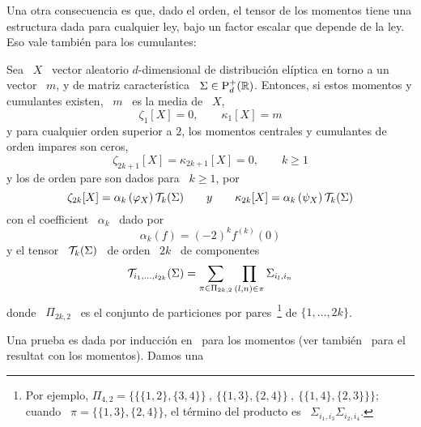 Una otra consecuencia es que, dado el orden, el tensor de los momentos tiene una
estructura dada  para cualquier ley,  bajo un factor  escalar que depende  de la
ley.  Eso vale tambi\'en para los cumulantes:
%
\begin{teorema}\label{Teo:MP:MomentosCumulantesEliptica}
%
  Sea \  $X$ \  vector aleatorio $d$-dimensional  de distribuci\'on  el\'iptica en
  torno a  un  vector \  $m$,  y  de  matriz  caracter\'istica \  $\Sigma  \in
  \mathrm{P}_d^+(\mathbb{R})$.  Entonces, si  estos momentos y cumulantes existen,  \ $m$ \ es
  la media de \ $X$, \ie
  \[
  \zeta_1[X] = 0, \qquad \kappa_1[X] = m
  \]
  y para cualquier orden superior a  $2$, los momentos centrales y cumulantes de
  orden impares son ceros,
  \[
  \zeta_{2 k + 1}[X] = \kappa_{2 k + 1}[X] = 0, \qquad k \ge 1
  \]
  y los de orden pare son dados para \ $k \ge 1$, por
  \[
  \zeta_{2 k}[X] = \alpha_k\left(  \varphi_X   \right) \mathcal{T}_k(\Sigma)
 \qquad  y \qquad \kappa_{2 k}[X] = \alpha_k\left(  \psi_X   \right) \mathcal{T}_k(\Sigma)
  \]
  con el coefficient \ $\alpha_k$ \ dado por
  \[
  \alpha_k(f) = (-2)^k f^{(k)}(0)
  \]
  y el tensor \ $\mathcal{T}_k(\Sigma)$ \ de orden \ $2 k$ \ de componentes
  \[
  \mathcal{T}_{i_1,\ldots,i_{2k}}(\Sigma) = \sum_{\pi \in \Pi_{2 k , 2}} \prod_{(l,n) \in
    \pi} \Sigma_{i_l,i_n}
  \]
  donde   \  $\Pi_{2   k  ,   2}$   \  es   el  conjunto   de  particiones   por
  pares~\footnote{Por  ejemplo, $\Pi_{4,2}  =  \Big\{ \big\{  \{1,2\} ,  \{3,4\}
    \big\} \:  , \: \big\{  \{1,3\} ,  \{2,4\} \big\} \:  , \: \big\{  \{1,4\} ,
    \{2,3\} \big\} \big\}$; cuando \ $\pi = \big\{ \{1,3\} , \{2,4\} \Big\}$, el
    t\'ermino del producto es \ $\Sigma_{i_1,i_3} \Sigma_{i_2,i_4}$.} de $\{ 1 ,
  \ldots , 2 k \}$.
\end{teorema}
%
Una prueba  es dada  por inducci\'on en~\cite{BerBen86}  para los  momentos (ver
tambi\'en~\cite[p.~44]{FanKot90} para el resultat  con los momentos).  Damos una
